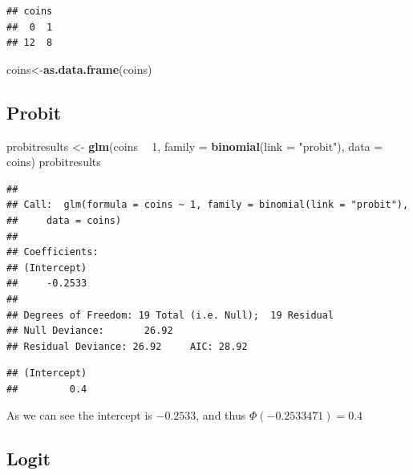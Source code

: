 \documentclass[
]{book}
\newenvironment{Shaded}{\begin{snugshade}}{\end{snugshade}}
\newcommand{\DataTypeTok}[1]{\textcolor[rgb]{0.13,0.29,0.53}{#1}}
\newcommand{\DecValTok}[1]{\textcolor[rgb]{0.00,0.00,0.81}{#1}}
\newcommand{\KeywordTok}[1]{\textcolor[rgb]{0.13,0.29,0.53}{\textbf{#1}}}
\newcommand{\NormalTok}[1]{#1}
\newcommand{\OperatorTok}[1]{\textcolor[rgb]{0.81,0.36,0.00}{\textbf{#1}}}
\newcommand{\StringTok}[1]{\textcolor[rgb]{0.31,0.60,0.02}{#1}}
\begin{document}
\begin{verbatim}
## coins
##  0  1 
## 12  8
\end{verbatim}

\begin{Shaded}
\begin{Highlighting}[]
\NormalTok{coins<-}\KeywordTok{as.data.frame}\NormalTok{(coins)}
\end{Highlighting}
\end{Shaded}

\hypertarget{probit-1}{%
\subsection{Probit}\label{probit-1}}

\begin{Shaded}
\begin{Highlighting}[]
\NormalTok{probitresults <-}\StringTok{ }\KeywordTok{glm}\NormalTok{(coins }\OperatorTok{~}\StringTok{ }\DecValTok{1}\NormalTok{, }\DataTypeTok{family =} \KeywordTok{binomial}\NormalTok{(}\DataTypeTok{link =} \StringTok{"probit"}\NormalTok{), }\DataTypeTok{data =}\NormalTok{ coins)}
\NormalTok{probitresults}
\end{Highlighting}
\end{Shaded}

\begin{verbatim}
## 
## Call:  glm(formula = coins ~ 1, family = binomial(link = "probit"), 
##     data = coins)
## 
## Coefficients:
## (Intercept)  
##     -0.2533  
## 
## Degrees of Freedom: 19 Total (i.e. Null);  19 Residual
## Null Deviance:       26.92 
## Residual Deviance: 26.92     AIC: 28.92
\end{verbatim}

\begin{Shaded}
\end{Shaded}

\begin{verbatim}
## (Intercept) 
##         0.4
\end{verbatim}

As we can see the intercept is \(-0.2533\), and thus \(\Phi(-0.2533471)=0.4\)

\hypertarget{logit-1}{%
\subsection{Logit}\label{logit-1}}
\end{document}
